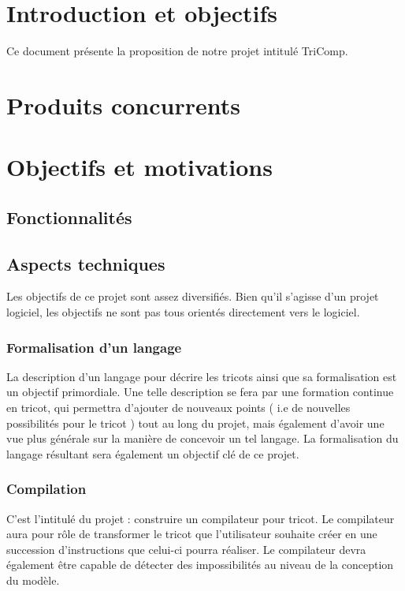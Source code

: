 \documentclass{article}
\begin{document}
\section{Introduction et objectifs}

Ce document présente la proposition de notre projet intitulé TriComp.


\section{Produits concurrents}

\section{Objectifs et motivations}

\subsection{Fonctionnalités}

\subsection{Aspects techniques}

Les objectifs de ce projet sont assez diversifiés. 
Bien qu'il s'agisse d'un projet logiciel, les objectifs ne sont pas tous orientés directement vers le logiciel.

\subsubsection{Formalisation d'un langage}

La description d'un langage pour décrire les tricots ainsi que sa formalisation est un objectif primordiale.
Une telle description se fera par une formation continue en tricot, qui permettra d'ajouter de nouveaux points ( i.e de nouvelles
possibilités pour le tricot ) tout au long du projet, mais également d'avoir une vue plus générale sur la manière de concevoir un tel
langage. La formalisation du langage résultant sera également un objectif clé de ce projet.

\subsubsection{Compilation}

C'est l'intitulé du projet : construire un compilateur pour tricot. Le compilateur aura pour rôle de transformer le tricot que 
l'utilisateur souhaite créer en une succession d'instructions que celui-ci pourra réaliser. Le compilateur devra également être capable de 
détecter des impossibilités au niveau de la conception du modèle.
\end{document}
